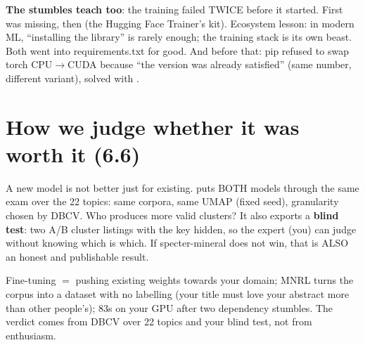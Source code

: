\documentclass[11pt,a4paper]{article}
\begin{document}
\begin{ojo}
\textbf{The stumbles teach too}: the training failed TWICE before it started. First
 was missing, then  (the Hugging Face Trainer's kit).
Ecosystem lesson: in modern ML, ``installing the library'' is rarely enough; the training stack
is its own beast. Both went into requirements.txt for good. And before that: pip refused to
swap torch CPU$\rightarrow$CUDA because ``the version was already satisfied'' (same number,
different variant), solved with .
\end{ojo}

\section{How we judge whether it was worth it (6.6)}

A new model is not better just for existing.  puts BOTH models
through the same exam over the 22 topics: same corpora, same UMAP (fixed seed), granularity
chosen by DBCV. Who produces more valid clusters? It also exports a \textbf{blind test}: two
A/B cluster listings with the key hidden, so the expert (you) can judge without knowing which
is which. If specter-mineral does not win, that is ALSO an honest and publishable result.

\begin{resumen}
Fine-tuning $=$ pushing existing weights towards your domain; MNRL turns the corpus into a
dataset with no labelling (your title must love your abstract more than other people's); 83s on
your GPU after two dependency stumbles. The verdict comes from DBCV over 22 topics and your
blind test, not from enthusiasm.
\end{resumen}
\end{document}
